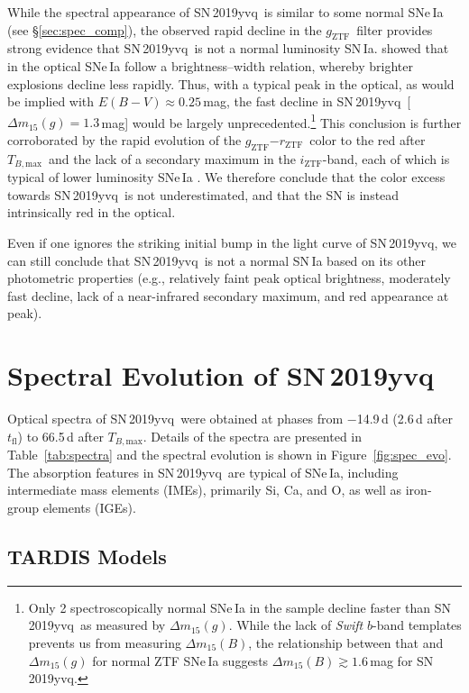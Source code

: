 \documentclass[twocolumn]{aastex63}
\newcommand{\rztf}{$r_\mathrm{ZTF}$}
\newcommand{\gztf}{$g_\mathrm{ZTF}$}
\newcommand{\iztf}{$i_\mathrm{ZTF}$}
\newcommand{\tfl}{$t_\mathrm{fl}$}
\newcommand{\tbmax}{$T_{B,\mathrm{max}}$}
\newcommand{\sn}{SN\,2019yvq}
\begin{document}
While the spectral appearance of \sn\ is similar to some normal SNe\,Ia (see
\S\ref{sec:spec_comp}), the observed rapid decline in the \gztf\ filter
provides strong evidence that \sn\ is not a normal luminosity SN\,Ia.
\citet{Phillips93} showed that in the optical SNe\,Ia follow a
brightness--width relation, whereby brighter explosions decline less rapidly.
Thus, with a typical peak in the optical, as would be implied with $E(B-V)
\approx 0.25$\,mag, the fast decline in \sn\ [$\Delta m_{15}(g) = 1.3$\,mag]
would be largely unprecedented.\footnote{Only 2 spectroscopically normal
SNe\,Ia in the \citet{Yao19} sample decline faster than \sn\ as measured by
$\Delta m_{15}(g)$. While the lack of \textit{Swift} $b$-band templates
prevents us from measuring $\Delta m_{15}(B)$, the relationship between that
and $\Delta m_{15}(g)$ for normal ZTF SNe\,Ia suggests $\Delta m_{15}(B)
\gtrsim 1.6$\,mag for \sn.} This conclusion is further corroborated by the
rapid evolution of the \gztf$-$\rztf\ color to the red after \tbmax\ and the
lack of a secondary maximum in the \iztf-band, each of which is typical of
lower luminosity SNe\,Ia \citep[see][and references therein]{Taubenberger17}.
We therefore conclude that the color excess towards \sn\ is not
underestimated, and that the SN is instead intrinsically red in the optical.

Even if one ignores the striking initial bump in the light curve of \sn, we
can still conclude that \sn\ is not a normal SN\,Ia based on its other
photometric properties (e.g., relatively faint peak optical brightness,
moderately fast decline, lack of a near-infrared secondary maximum, and red
appearance at peak).

\section{Spectral Evolution of \sn}\label{sec:spec}

Optical spectra of \sn\ were obtained at phases from $-$14.9\,d (2.6\,d after
\tfl) to 66.5\,d after \tbmax. Details of the spectra are presented in
Table~\ref{tab:spectra} and the spectral evolution is shown in
Figure~\ref{fig:spec_evo}. The absorption features in \sn\ are typical of
SNe\,Ia, including intermediate mass elements (IMEs), primarily Si, Ca, and O,
as well as iron-group elements (IGEs).

\subsection{TARDIS Models}\label{sec:tardis}
\end{document}
